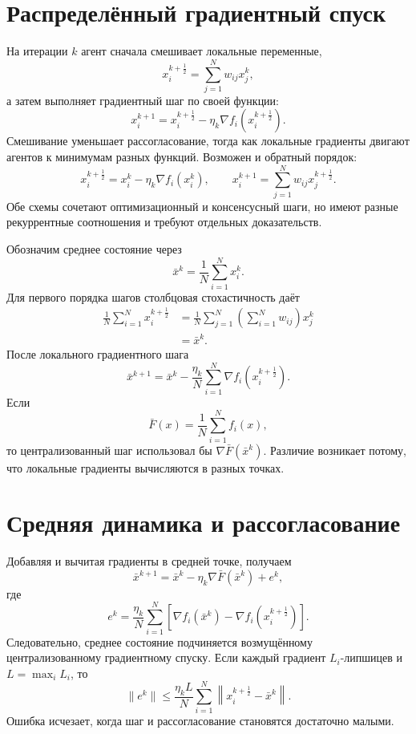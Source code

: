\section{Распределённый градиентный спуск}

На итерации \(k\) агент сначала смешивает локальные переменные,
\[
    x_i^{k+\frac12}
    =
    \sum_{j=1}^{N}w_{ij}x_j^k,
\]
а затем выполняет градиентный шаг по своей функции:
\[
    x_i^{k+1}
    =
    x_i^{k+\frac12}
    -
    \eta_k\nabla f_i\!\left(x_i^{k+\frac12}\right).
\]
Смешивание уменьшает рассогласование, тогда как локальные градиенты
двигают агентов к минимумам разных функций. Возможен и обратный
порядок:
\[
    x_i^{k+\frac12}
    =
    x_i^k-\eta_k\nabla f_i(x_i^k),
    \qquad
    x_i^{k+1}
    =
    \sum_{j=1}^{N}w_{ij}x_j^{k+\frac12}.
\]
Обе схемы сочетают оптимизационный и консенсусный шаги, но имеют
разные рекуррентные соотношения и требуют отдельных доказательств.

Обозначим среднее состояние через
\[
    \bar x^k
    =
    \frac1N\sum_{i=1}^{N}x_i^k.
\]
Для первого порядка шагов столбцовая стохастичность даёт
\[
\begin{aligned}
    \frac1N\sum_{i=1}^{N}x_i^{k+\frac12}
    &=
    \frac1N\sum_{j=1}^{N}
    \left(\sum_{i=1}^{N}w_{ij}\right)x_j^k
    \\
    &=
    \bar x^k.
\end{aligned}
\]
После локального градиентного шага
\[
    \bar x^{k+1}
    =
    \bar x^k
    -
    \frac{\eta_k}{N}
    \sum_{i=1}^{N}
    \nabla f_i\!\left(x_i^{k+\frac12}\right).
\]
Если
\[
    \bar F(x)=\frac1N\sum_{i=1}^{N}f_i(x),
\]
то централизованный шаг использовал бы
\(\nabla\bar F(\bar x^k)\). Различие возникает потому, что локальные
градиенты вычисляются в разных точках.

\section{Средняя динамика и рассогласование}

Добавляя и вычитая градиенты в средней точке, получаем
\[
    \bar x^{k+1}
    =
    \bar x^k
    -
    \eta_k\nabla\bar F(\bar x^k)
    +
    e^k,
\]
где
\[
    e^k
    =
    \frac{\eta_k}{N}
    \sum_{i=1}^{N}
    \left[
        \nabla f_i(\bar x^k)
        -
        \nabla f_i\!\left(x_i^{k+\frac12}\right)
    \right].
\]
Следовательно, среднее состояние подчиняется возмущённому
централизованному градиентному спуску. Если каждый градиент
\(L_i\)-липшицев и \(L=\max_iL_i\), то
\[
    \lVert e^k\rVert
    \le
    \frac{\eta_kL}{N}
    \sum_{i=1}^{N}
    \left\lVert x_i^{k+\frac12}-\bar x^k\right\rVert.
\]
Ошибка исчезает, когда шаг и рассогласование становятся достаточно
малыми.

